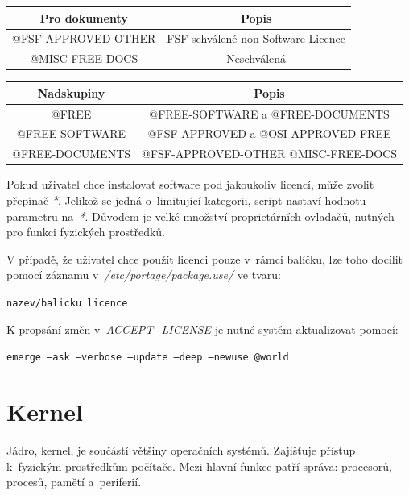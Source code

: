 \documentclass[12pt,a4paper,twoside,]{article}
\begin{document}
{{{{{{{\begin{table}[h]
\begin{tabular}{|c|c|c|}
	\end{tabular}
\end{table}
\begin{table}[h]
	\centering
	\begin{tabular}{|c|c|}
		\hline
		Pro dokumenty & Popis \\
		\hline
		@FSF-APPROVED-OTHER & FSF schválené non-Software Licence \\
		\hline
		@MISC-FREE-DOCS & Neschválená \\
		\hline
	\end{tabular}
\end{table}
\begin{table}[h]
	\centering
	\begin{tabular}{|c|c|}
	\hline
	Nadskupiny & Popis \\
	\hline
	@FREE & @FREE-SOFTWARE a @FREE-DOCUMENTS \\
	\hline
	@FREE-SOFTWARE & @FSF-APPROVED a @OSI-APPROVED-FREE\\
	\hline
	@FREE-DOCUMENTS & @FSF-APPROVED-OTHER @MISC-FREE-DOCS\\
	\hline
	\end{tabular}
\end{table}
\hspace{-1.5em}Pokud uživatel chce instalovat software pod jakoukoliv licencí, může zvolit přepínač \textit{*}.
Jelikož se jedná o~limitující kategorii, script nastaví hodnotu parametru na~\textit{*}. Důvodem je velké množství proprietárních ovladačů, nutných pro funkci fyzických prostředků.


\hspace*{-1.5em}V případě, že uživatel chce použít licenci pouze v~rámci balíčku, lze toho docílit pomocí záznamu v~\textit{/etc/portage/package.use/} ve tvaru:

\texttt{nazev/balicku licence}

\hspace{-1.5em}K propsání změn v~\textit{ACCEPT\_LICENSE} je nutné systém aktualizovat pomocí:

\texttt{emerge --ask --verbose --update --deep --newuse @world}


\newpage

\section{\textsf{Kernel}}\hypertarget{Kernel}{}
Jádro, kernel, je součástí většiny operačních systémů. Zajišťuje přístup k~fyzickým prostředkům počítače. Mezi hlavní funkce patří správa: procesorů, procesů, pamětí a~periferií. 

}}}}}}}
\end{document}
